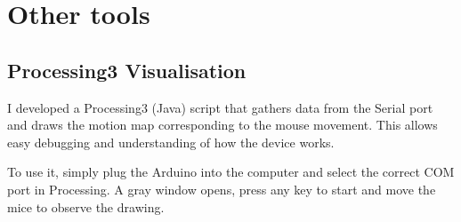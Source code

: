 \documentclass[a4paper]{article}
\begin{document}
\section{Other tools}
\subsection{Processing3 Visualisation}
\label{processing}
I developed a Processing3 (Java) script that gathers data from the Serial port and draws the motion map corresponding to the mouse movement. This allows easy debugging and understanding of how the device works.

To use it, simply plug the Arduino into the computer and select the correct COM port in Processing. A gray window opens, press any key to start and move the mice to observe the drawing.

\appendix



\end{document}
